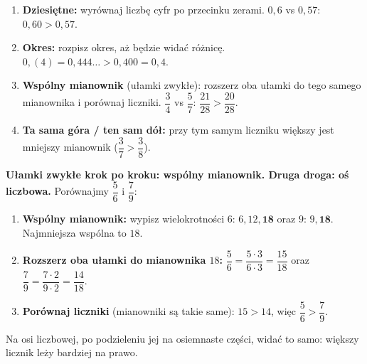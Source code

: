 \documentclass[11pt,a4paper]{article}
\begin{document}

\vspace{0.3em}
\begin{regula}
\begin{enumerate}[leftmargin=*, itemsep=2pt]
  \item \textbf{Dziesiętne:} wyrównaj liczbę cyfr po przecinku zerami. $0{,}6$ vs $0{,}57$: $0{,}60 > 0{,}57$.
  \item \textbf{Okres:} rozpisz okres, aż będzie widać różnicę. $0{,}(4)=0{,}444\ldots > 0{,}400 = 0{,}4$.
  \item \textbf{Wspólny mianownik} (ułamki zwykłe): rozszerz oba ułamki do tego samego mianownika i porównaj liczniki. $\dfrac{3}{4}$ vs $\dfrac{5}{7}$: $\dfrac{21}{28}>\dfrac{20}{28}$.
  \item \textbf{Ta sama góra / ten sam dół:} przy tym samym liczniku większy jest mniejszy mianownik ($\dfrac{3}{7}>\dfrac{3}{8}$).
\end{enumerate}
\end{regula}

\vspace{0.4em}
\textbf{Ułamki zwykłe krok po kroku: wspólny mianownik. Druga droga: oś liczbowa.} Porównajmy $\dfrac{5}{6}$ i $\dfrac{7}{9}$:
\begin{enumerate}[leftmargin=*, itemsep=3pt]
  \item \textbf{Wspólny mianownik:} wypisz wielokrotności $6$: $6, 12, \mathbf{18}$ oraz $9$: $9, \mathbf{18}$. Najmniejsza wspólna to $18$.
  \item \textbf{Rozszerz oba ułamki do mianownika $18$:} $\dfrac{5}{6}=\dfrac{5\cdot 3}{6\cdot 3}=\dfrac{15}{18}$ \quad oraz \quad $\dfrac{7}{9}=\dfrac{7\cdot 2}{9\cdot 2}=\dfrac{14}{18}$.
  \item \textbf{Porównaj liczniki} (mianowniki są takie same): $15>14$, więc $\dfrac{5}{6}>\dfrac{7}{9}$.
\end{enumerate}
Na osi liczbowej, po podzieleniu jej na osiemnaste części, widać to samo: większy licznik leży bardziej na prawo.

\begin{center}
\end{center}
\end{document}
